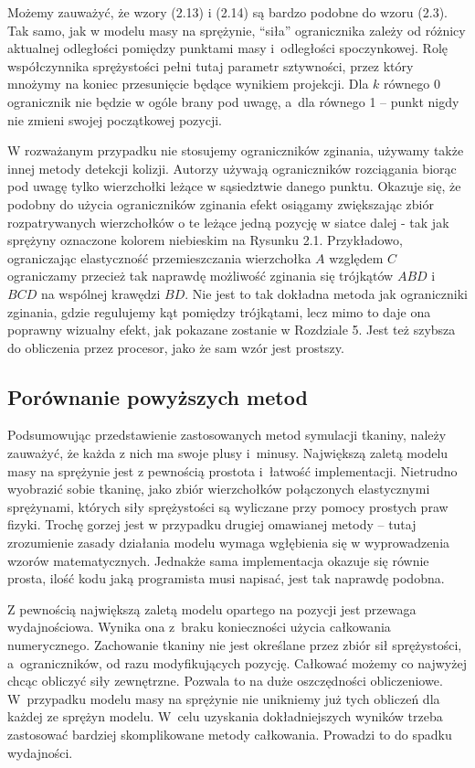 			Możemy zauważyć, że wzory (2.13) i (2.14) są bardzo podobne do wzoru (2.3). Tak samo, jak w modelu masy na sprężynie, ``siła'' ogranicznika zależy od różnicy aktualnej odległości pomiędzy punktami masy i~odległości spoczynkowej. Rolę współczynnika sprężystości pełni tutaj parametr sztywności, przez który mnożymy na koniec przesunięcie będące wynikiem projekcji. Dla \(k\) równego 0 ogranicznik nie będzie w ogóle brany pod uwagę, a~dla równego 1 -- punkt nigdy nie zmieni swojej początkowej pozycji.
			
			W rozważanym przypadku nie stosujemy ograniczników zginania, używamy także innej metody detekcji kolizji. Autorzy \cite{posbased} używają ograniczników rozciągania biorąc pod uwagę tylko wierzchołki leżące w sąsiedztwie danego punktu. Okazuje się, że podobny do użycia ograniczników zginania efekt osiągamy zwiększając zbiór rozpatrywanych wierzchołków o te leżące jedną pozycję w siatce dalej - tak jak sprężyny oznaczone kolorem niebieskim na Rysunku 2.1. Przykładowo, ograniczając elastyczność przemieszczania wierzchołka \(A\) względem \(C\) ograniczamy przecież tak naprawdę możliwość zginania się trójkątów \(ABD\) i~\(BCD\) na wspólnej krawędzi \(BD\). Nie jest to tak dokładna metoda jak ograniczniki zginania, gdzie regulujemy kąt pomiędzy trójkątami, lecz mimo to daje ona poprawny wizualny efekt, jak pokazane zostanie w Rozdziale 5. Jest też szybsza do obliczenia przez procesor, jako że sam wzór jest prostszy.
		
		\subsection{Porównanie powyższych metod}
		\label{t:teoria:analiza:porownanie}
		
			Podsumowując przedstawienie zastosowanych metod symulacji tkaniny, należy zauważyć, że każda z nich ma swoje plusy i~minusy. Największą zaletą modelu masy na sprężynie jest z pewnością prostota i~łatwość implementacji. Nietrudno wyobrazić sobie tkaninę, jako zbiór wierzchołków połączonych elastycznymi sprężynami, których siły sprężystości są wyliczane przy pomocy prostych praw fizyki. Trochę gorzej jest w przypadku drugiej omawianej metody -- tutaj zrozumienie zasady działania modelu wymaga wgłębienia się w wyprowadzenia wzorów matematycznych. Jednakże sama implementacja okazuje się równie prosta, ilość kodu jaką programista musi napisać, jest tak naprawdę podobna.
			
			Z pewnością największą zaletą modelu opartego na pozycji jest przewaga wydajnościowa. Wynika ona z~braku konieczności użycia całkowania numerycznego. Zachowanie tkaniny nie jest określane przez zbiór sił sprężystości, a~ograniczników, od razu modyfikujących pozycję. Całkować możemy co najwyżej chcąc obliczyć siły zewnętrzne. Pozwala to na duże oszczędności obliczeniowe. W~przypadku modelu masy na sprężynie nie unikniemy już tych obliczeń dla każdej ze sprężyn modelu. W~celu uzyskania dokładniejszych wyników trzeba zastosować bardziej skomplikowane metody całkowania. Prowadzi to do spadku wydajności.
			
